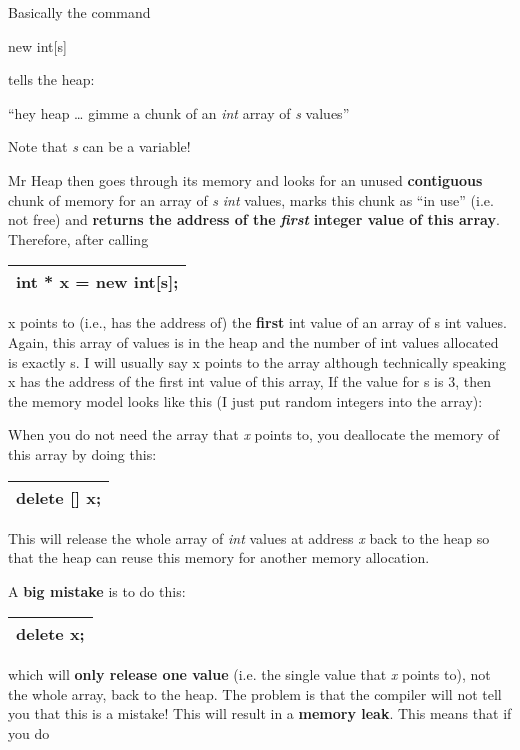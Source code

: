 \documentclass[
]{article}
\begin{document}
Basically the command

new int{[}s{]}

tells the heap:

``hey heap \ldots{} gimme a chunk of an \emph{int} array of \emph{s
}values''

Note that \emph{s} can be a variable!

Mr Heap then goes through its memory and looks for an unused
\textbf{contiguous} chunk of memory for an array of \emph{s} \emph{int}
values, marks this chunk as ``in use'' (i.e. not free) and
\textbf{returns the address of the }\emph{\textbf{first}}\textbf{
integer value of this array}. Therefore, after calling

\begin{longtable}[]{@{}l@{}}
\toprule
\endhead
int * x = new int{[}s{]};\tabularnewline
\bottomrule
\end{longtable}

x points to (i.e., has the address of) the \textbf{first} int value of
an array of s int values. Again, this array of values is in the heap and
the number of int values allocated is exactly s. I will usually say x
points to the array although technically speaking x has the address of
the first int value of this array, If the value for s is 3, then the
memory model looks like this (I just put random integers into the
array):

\hfill\break

When you do not need the array that \emph{x} points to, you deallocate
the memory of this array by doing this:

\begin{longtable}[]{@{}l@{}}
\toprule
\endhead
delete {[}{]} x;\tabularnewline
\bottomrule
\end{longtable}

This will release the whole array of \emph{int} values at address
\emph{x} back to the heap so that the heap can reuse this memory for
another memory allocation.

A \textbf{big mistake} is to do this:

\begin{longtable}[]{@{}l@{}}
\toprule
\endhead
delete x;\tabularnewline
\bottomrule
\end{longtable}

which will \textbf{only release one value} (i.e. the single value that
\emph{x} points to), not the whole array, back to the heap. The problem
is that the compiler will not tell you that this is a mistake! This will
result in a \textbf{memory leak}. This means that if you do
\end{document}
